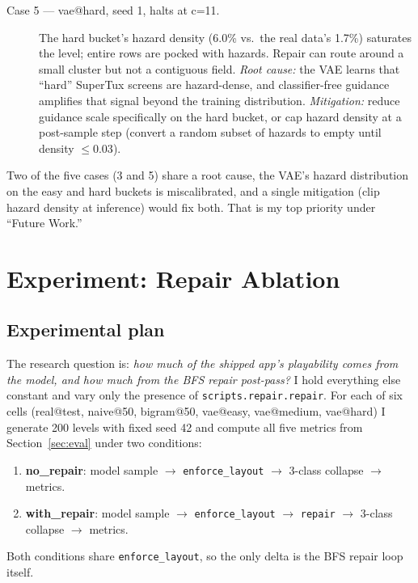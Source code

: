 \documentclass[11pt]{article}
\begin{document}
\begin{description}
    \item[Case 5 --- vae@hard, seed 1, halts at c=11.] The hard
    bucket's hazard density (6.0\% vs.\ the real data's 1.7\%) saturates
    the level; entire rows are pocked with hazards. Repair can route
    around a small cluster but not a contiguous field.
    \emph{Root cause:} the VAE learns that ``hard'' SuperTux screens
    are hazard-dense, and classifier-free guidance amplifies that
    signal beyond the training distribution.
    \emph{Mitigation:} reduce guidance scale specifically on the hard
    bucket, or cap hazard density at a post-sample step (convert a
    random subset of hazards to empty until density $\leq 0.03$).
\end{description}

Two of the five cases (3 and 5) share a root cause, the VAE's hazard
distribution on the easy and hard buckets is miscalibrated, and a
single mitigation (clip hazard density at inference) would fix both.
That is my top priority under ``Future Work.''

\section{Experiment: Repair Ablation}
\label{sec:experiment}

\subsection{Experimental plan}
The research question is: \emph{how much of the shipped app's
playability comes from the model, and how much from the BFS repair
post-pass?} I hold everything else constant and vary only the
presence of \texttt{scripts.repair.repair}. For each of six cells
(real@test, naive@50, bigram@50, vae@easy, vae@medium, vae@hard) I
generate 200 levels with fixed seed 42 and compute all five metrics
from Section~\ref{sec:eval} under two conditions:
\begin{enumerate}
    \item \textbf{no\_repair}: model sample $\to$
    \texttt{enforce\_layout} $\to$ 3-class collapse $\to$ metrics.
    \item \textbf{with\_repair}: model sample $\to$
    \texttt{enforce\_layout} $\to$ \texttt{repair} $\to$ 3-class
    collapse $\to$ metrics.
\end{enumerate}
Both conditions share \texttt{enforce\_layout}, so the only delta is
the BFS repair loop itself.
\end{document}

